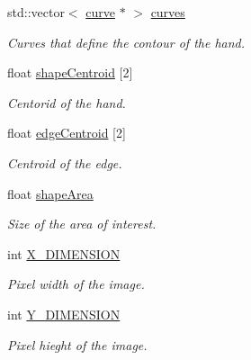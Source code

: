 \begin{DoxyCompactItemize}
std\+::vector$<$ \hyperlink{structcurve}{curve} $\ast$ $>$ \hyperlink{class_hand_a1a90a57256c5d724a12db86cb55c57c2}{curves}
\begin{DoxyCompactList}\small\item\em Curves that define the contour of the hand. \end{DoxyCompactList}\item 
\hypertarget{class_hand_a89099eeaa8a0286f6baae95d3b0a9f20}{}\label{class_hand_a89099eeaa8a0286f6baae95d3b0a9f20} 
float \hyperlink{class_hand_a89099eeaa8a0286f6baae95d3b0a9f20}{shape\+Centroid} \mbox{[}2\mbox{]}
\begin{DoxyCompactList}\small\item\em Centorid of the hand. \end{DoxyCompactList}\item 
\hypertarget{class_hand_a44e1328fa33595d1d81e0aaa6109cb6d}{}\label{class_hand_a44e1328fa33595d1d81e0aaa6109cb6d} 
float \hyperlink{class_hand_a44e1328fa33595d1d81e0aaa6109cb6d}{edge\+Centroid} \mbox{[}2\mbox{]}
\begin{DoxyCompactList}\small\item\em Centroid of the edge. \end{DoxyCompactList}\item 
\hypertarget{class_hand_a505288f2ffe79800bcb8b5ccb4f1995a}{}\label{class_hand_a505288f2ffe79800bcb8b5ccb4f1995a} 
float \hyperlink{class_hand_a505288f2ffe79800bcb8b5ccb4f1995a}{shape\+Area}
\begin{DoxyCompactList}\small\item\em Size of the area of interest. \end{DoxyCompactList}\item 
\hypertarget{class_hand_a406c0335ce812fd226df4678e3322558}{}\label{class_hand_a406c0335ce812fd226df4678e3322558} 
int \hyperlink{class_hand_a406c0335ce812fd226df4678e3322558}{X\+\_\+\+D\+I\+M\+E\+N\+S\+I\+ON}
\begin{DoxyCompactList}\small\item\em Pixel width of the image. \end{DoxyCompactList}\item 
\hypertarget{class_hand_a7d6177d54f9bf9b7e6c0e0d8aff5f935}{}\label{class_hand_a7d6177d54f9bf9b7e6c0e0d8aff5f935} 
int \hyperlink{class_hand_a7d6177d54f9bf9b7e6c0e0d8aff5f935}{Y\+\_\+\+D\+I\+M\+E\+N\+S\+I\+ON}
\begin{DoxyCompactList}\small\item\em Pixel hieght of the image. \end{DoxyCompactList}\item 

\end{DoxyCompactItemize}
